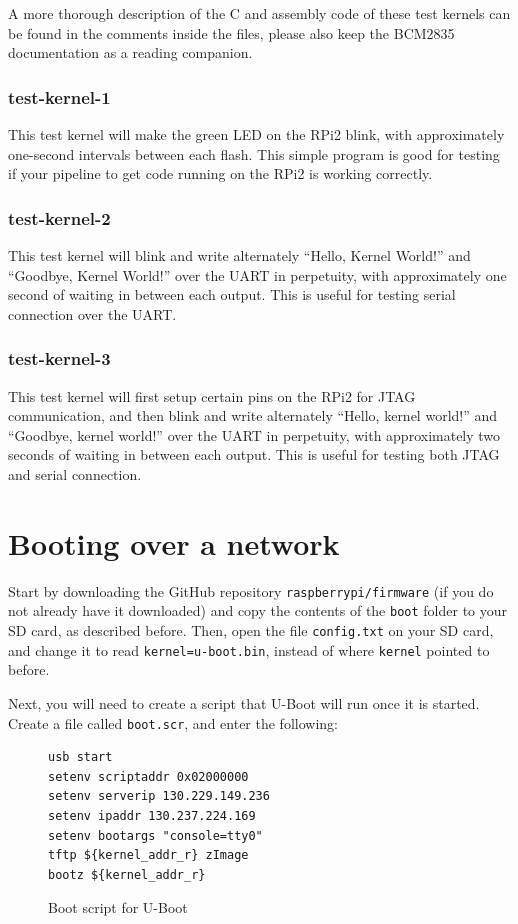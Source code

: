 \documentclass[a4paper,11pt,reqno]{amsart}
\begin{document}
A more thorough description of the C and assembly code of these test kernels can be found in the comments inside the files, please also keep the BCM2835 documentation as a reading companion.

\subsubsection{test-kernel-1}
This test kernel will make the green LED on the RPi2 blink, with approximately one-second intervals between each flash. This simple program is good for testing if your pipeline to get code running on the RPi2 is working correctly.

\subsubsection{test-kernel-2}
This test kernel will blink and write alternately ``Hello, Kernel World!'' and ``Goodbye, Kernel World!'' over the UART in perpetuity, with approximately one second of waiting in between each output. This is useful for testing serial connection over the UART.

\subsubsection{test-kernel-3}
This test kernel will first setup certain pins on the RPi2 for JTAG communication, and then blink and write alternately ``Hello, kernel world!'' and ``Goodbye, kernel world!'' over the UART in perpetuity, with approximately two seconds of waiting in between each output. This is useful for testing both JTAG and serial connection.

\section{Booting over a network}
Start by downloading the GitHub repository \texttt{raspberrypi/firmware} (if you do not already have it downloaded) and copy the contents of the \texttt{boot} folder to your SD card, as described before. Then, open the file \texttt{config.txt} on your SD card, and change it to read \texttt{kernel=u-boot.bin}, instead of where \texttt{kernel} pointed to before.

Next, you will need to create a script that U-Boot will run once it is started. Create a file called \texttt{boot.scr}, and enter the following:

\begin{figure}[hb]
\begin{center}
\begin{BVerbatim}
usb start
setenv scriptaddr 0x02000000
setenv serverip 130.229.149.236
setenv ipaddr 130.237.224.169
setenv bootargs "console=tty0"
tftp ${kernel_addr_r} zImage
bootz ${kernel_addr_r}
\end{BVerbatim}
\end{center}
\caption{Boot script for U-Boot}
\label{fig:boots}
\end{figure}
\end{document}
